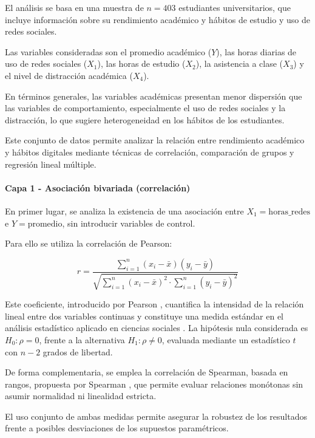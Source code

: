 \documentclass[12pt]{article}
\begin{document}
El análisis se basa en una muestra de $n = \text{403}$ estudiantes universitarios, que incluye información sobre su rendimiento académico y hábitos de estudio y uso de redes sociales.

Las variables consideradas son el promedio académico ($Y$), las horas diarias de uso de redes sociales ($X_1$), las horas de estudio ($X_2$), la asistencia a clase ($X_3$) y el nivel de distracción académica ($X_4$).

En términos generales, las variables académicas presentan menor dispersión que las variables de comportamiento, especialmente el uso de redes sociales y la distracción, lo que sugiere heterogeneidad en los hábitos de los estudiantes.

Este conjunto de datos permite analizar la relación entre rendimiento académico y hábitos digitales mediante técnicas de correlación, comparación de grupos y regresión lineal múltiple.

\paragraph{Capa 1 - Asociación bivariada (correlación)}

En primer lugar, se analiza la existencia de una asociación entre \(X_1 = \text{horas\_redes}\) e \(Y = \text{promedio}\), sin introducir variables de control.

Para ello se utiliza la correlación de Pearson:

\[
r = \frac{\sum_{i=1}^{n}(x_i - \bar{x})(y_i - \bar{y})}{\sqrt{\sum_{i=1}^{n}(x_i - \bar{x})^2 \cdot \sum_{i=1}^{n}(y_i - \bar{y})^2}}
\]

Este coeficiente, introducido por Pearson \cite{pearson1896}, cuantifica la intensidad de la relación lineal entre dos variables continuas y constituye una medida estándar en el análisis estadístico aplicado en ciencias sociales \cite{montgomery2014}. La hipótesis nula considerada es \(H_0: \rho = 0\), frente a la alternativa \(H_1: \rho \neq 0\), evaluada mediante un estadístico \(t\) con \(n-2\) grados de libertad.

De forma complementaria, se emplea la correlación de Spearman, basada en rangos, propuesta por Spearman \cite{spearman1904}, que permite evaluar relaciones monótonas sin asumir normalidad ni linealidad estricta.

El uso conjunto de ambas medidas permite asegurar la robustez de los resultados frente a posibles desviaciones de los supuestos paramétricos.
\end{document}
